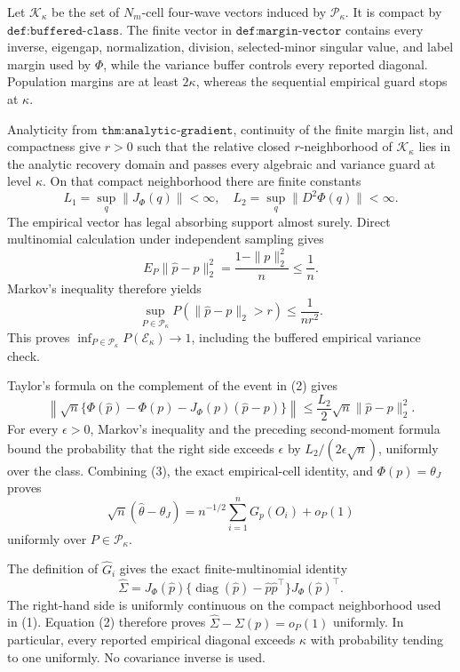 Let \(\mathcal K_\kappa\) be the set of \(N_m\)-cell four-wave vectors induced by \(\mathcal P_\kappa\).  It is compact by \(\texttt{def:buffered-class}\).  The finite vector in \(\texttt{def:margin-vector}\) contains every inverse, eigengap, normalization, division, selected-minor singular value, and label margin used by \(\Phi\), while the variance buffer controls every reported diagonal.  Population margins are at least \(2\kappa\), whereas the sequential empirical guard stops at \(\kappa\).

Analyticity from \(\texttt{thm:analytic-gradient}\), continuity of the finite margin list, and compactness give \(r>0\) such that the relative closed \(r\)-neighborhood of \(\mathcal K_\kappa\) lies in the analytic recovery domain and passes every algebraic and variance guard at level \(\kappa\).  On that compact neighborhood there are finite constants
\[
 L_1=\sup_q\|J_\Phi(q)\|<\infty,
 \quad
 L_2=\sup_q\|D^2\Phi(q)\|<\infty.
\tag{1}
\]
The empirical vector has legal absorbing support almost surely.  Direct multinomial calculation under independent sampling gives
\[
 E_P\|\widehat p-p\|_2^2
 =\frac{1-\|p\|_2^2}{n}\leq\frac1n.
\]
Markov's inequality therefore yields
\[
 \sup_{P\in\mathcal P_\kappa}
 P(\|\widehat p-p\|_2>r)\leq\frac1{nr^2}.
\tag{2}
\]
This proves \(\inf_{P\in\mathcal P_\kappa}P(\mathcal E_\kappa)\to1\), including the buffered empirical variance check.

Taylor's formula on the complement of the event in (2) gives
\[
 \left\|\sqrt n\{\Phi(\widehat p)-\Phi(p)
 -J_\Phi(p)(\widehat p-p)\}\right\|
 \leq\frac{L_2}{2}\sqrt n\|\widehat p-p\|_2^2.
\tag{3}
\]
For every \(\epsilon>0\), Markov's inequality and the preceding second-moment formula bound the probability that the right side exceeds \(\epsilon\) by \(L_2/(2\epsilon\sqrt n)\), uniformly over the class.  Combining (3), the exact empirical-cell identity, and \(\Phi(p)=\theta_J\) proves
\[
 \sqrt n(\widehat\theta-\theta_J)
 =n^{-1/2}\sum_{i=1}^nG_p(O_i)+o_P(1)
\tag{4}
\]
uniformly over \(P\in\mathcal P_\kappa\).

The definition of \(\widehat G_i\) gives the exact finite-multinomial identity
\[
 \widehat\Sigma=J_\Phi(\widehat p)
 \{\operatorname{diag}(\widehat p)-\widehat p\widehat p^\top\}
 J_\Phi(\widehat p)^\top.
\tag{5}
\]
The right-hand side is uniformly continuous on the compact neighborhood used in (1).  Equation (2) therefore proves \(\widehat\Sigma-\Sigma(p)=o_P(1)\) uniformly.  In particular, every reported empirical diagonal exceeds \(\kappa\) with probability tending to one uniformly.  No covariance inverse is used.

